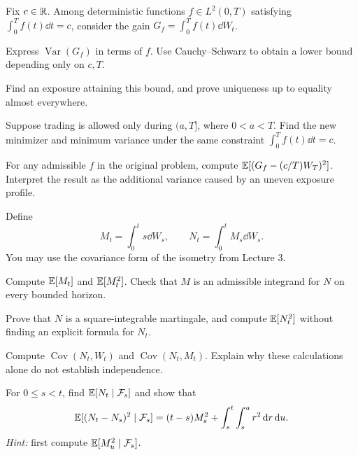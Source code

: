 \begin{exercise}
Fix \(c\in\mathbb{R}\). Among deterministic functions \(f\in L^2(0,T)\)
satisfying \(\int_0^T f(t)\dd t=c\), consider the gain
\(G_f=\int_0^T f(t)\dd W_t\).
\begin{exparts}
  \item Express \(\operatorname{Var}(G_f)\) in terms of \(f\).
  Use Cauchy--Schwarz to obtain a lower bound depending only on \(c,T\).
  \item Find an exposure attaining this bound, and prove uniqueness up to
  equality almost everywhere.
  \item Suppose trading is allowed only during \((a,T]\), where
  \(0<a<T\). Find the new minimizer and minimum variance under the same
  constraint \(\int_0^T f(t)\dd t=c\).
  \item For any admissible \(f\) in the original problem, compute
  \(\mathbb E[(G_f-(c/T)W_T)^2]\). Interpret the result as the additional
  variance caused by an uneven exposure profile.
\end{exparts}
\end{exercise}

\begin{exercise}
Define
\[
M_t=\int_0^t s\dd W_s,
\qquad
N_t=\int_0^t M_s\dd W_s.
\]
You may use the covariance form of the isometry from Lecture 3.
\begin{exparts}
  \item Compute \(\mathbb E[M_t]\) and \(\mathbb E[M_t^2]\). Check that \(M\) is
  an admissible integrand for \(N\) on every bounded horizon.
  \item Prove that \(N\) is a square-integrable martingale, and compute
  \(\mathbb E[N_t^2]\) without finding an explicit formula for \(N_t\).
  \item Compute \(\operatorname{Cov}(N_t,W_t)\) and
  \(\operatorname{Cov}(N_t,M_t)\). Explain why these calculations alone
  do not establish independence.
  \item For \(0\leq s<t\), find \(\mathbb E[N_t\mid\mathcal F_s]\) and show that
  \[
  \mathbb E[(N_t-N_s)^2\mid\mathcal F_s]
  =(t-s)M_s^2+\int_s^t\int_s^u r^2\,\mathrm d r\,\mathrm d u.
  \]
  \emph{Hint:} first compute \(\mathbb E[M_u^2\mid\mathcal F_s]\).
\end{exparts}
\end{exercise}
\fi
